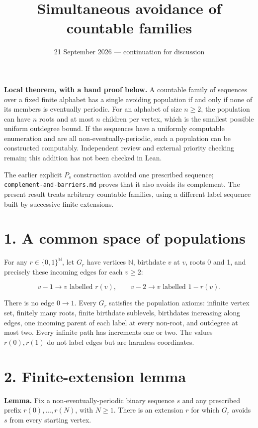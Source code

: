 \documentclass[
  11pt,
]{article}
\title{Simultaneous avoidance of countable families}
\author{}
\date{21 September 2026 --- continuation for discussion}
\begin{document}
\maketitle

\textbf{Local theorem, with a hand proof below.} A countable family of
sequences over a fixed finite alphabet has a single avoiding population
if and only if none of its members is eventually periodic. For an
alphabet of size \(n\ge2\), the population can have \(n\) roots and at
most \(n\) children per vertex, which is the smallest possible uniform
outdegree bound. If the sequences have a uniformly computable
enumeration and are all non-eventually-periodic, such a population can
be constructed computably. Independent review and external priority
checking remain; this addition has not been checked in Lean.

The earlier explicit \(P_s\) construction avoided one prescribed
sequence; \texttt{complement-and-barriers.md} proves that it also avoids
its complement. The present result treats arbitrary countable families,
using a different label sequence built by successive finite extensions.

\section{1. A common space of
populations}\label{a-common-space-of-populations}

For any \(r\in\{0,1\}^{\mathbb N}\), let \(G_r\) have vertices
\(\mathbb N\), birthdate \(v\) at \(v\), roots 0 and 1, and precisely
these incoming edges for each \(v\ge2\):

\[v-1\longrightarrow v\text{ labelled }r(v),\qquad
v-2\longrightarrow v\text{ labelled }1-r(v).\]

There is no edge \(0\to1\). Every \(G_r\) satisfies the population
axioms: infinite vertex set, finitely many roots, finite birthdate
sublevels, birthdates increasing along edges, one incoming parent of
each label at every non-root, and outdegree at most two. Every infinite
path has increments one or two. The values \(r(0),r(1)\) do not label
edges but are harmless coordinates.

\section{2. Finite-extension lemma}\label{finite-extension-lemma}

\textbf{Lemma.} Fix a non-eventually-periodic binary sequence \(s\) and
any prescribed prefix \(r(0),\ldots,r(N)\), with \(N\ge1\). There is an
extension \(r\) for which \(G_r\) avoids \(s\) from every starting
vertex.
\end{document}
